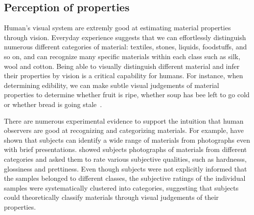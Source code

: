 

\subsection{Perception of properties}
Human's visual system are extremly good at estimating material properties through vision. Everyday experience suggests that we can effortlessly distinguish numerous different categories of material: textiles, stones, liquids, foodstuffs, and so on, and can recognize many specific materials within each class such as silk, wool and cotton. Being able to visually distinguish different material and infer their properties by vision is a critical capability for humans. For instance, when determining edibility, we can make subtle visual judgements of material properties to determine whether fruit is ripe, whether soup has bee left to go cold or whether bread is going stale~\cite{fleming2014visual}.

There are numerous experimental evidence to support the intuition that human observers are good at recognizing and categorizing materials. For example, \citeauthor{sharan2009material} have shown that subjects can identify a wide range of materials from photographs even with brief presentations. \citeauthor{fleming2013perceptual} showed subjects photographs of materials from different categories and asked them to rate various subjective qualities, such as hardnesss, glossiness and prettiness. Even though subjects were not explicitly informed that the samples belonged to different classes, the subjective ratings of the individual samples were systematically clustered into categories, suggesting that subjects could theoretically classify materials through visual judgements of their properties.

